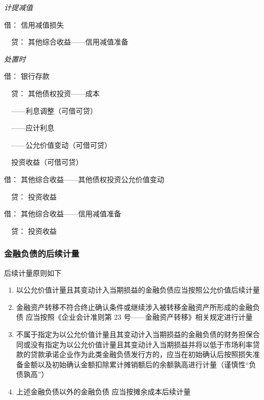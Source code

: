 \documentclass[UTF8,12pt]{ctexart}
\newenvironment{Dr}{\noindent 借：}{\par}
\newenvironment{Cr}{\noindent \ \ 贷：}{\par}
\numberwithin{equation}{section} %
\numberwithin{figure}{section}
\numberwithin{table}{section}
\begin{document}
	
	\textit{计提减值}
	
	\begin{Dr}
		信用减值损失
	\end{Dr}
	\begin{Cr}
		其他综合收益——信用减值准备
	\end{Cr}

	
	\textit{处置时}
	
	\begin{Dr}
		银行存款
	\end{Dr}
	\begin{Cr}
		其他债权投资——成本
		
		\ \ ——利息调整（可借可贷）
		
		\ \ ——应计利息
		
		\ \ ——公允价值变动（可借可贷） 
		
		\ \ 投资收益（可借可贷）
	\end{Cr}

	\begin{Dr}
		其他综合收益——其他债权投资公允价值变动
	\end{Dr}
	\begin{Cr}
		投资收益
	\end{Cr}
	
	\begin{Dr}
		其他综合收益——信用减值准备
	\end{Dr}
	\begin{Cr}
		投资收益
	\end{Cr}
	
	
	
	
	
	\subsubsection{金融负债的后续计量}
	后续计量原则如下
	\begin{enumerate}
		\item 以公允价值计量且其变动计入当期损益的金融负债应当按照公允价值后续计量
		
		\item 金融资产转移不符合终止确认条件或继续涉入被转移金融资产所形成的金融负债	应当按照《企业会计准则第 23 号——金融资产转移》相关规定进行计量
		
		\item 不属于指定为以公允价值计量且其变动计入当期损益的金融负债的财务担保合同或没有指定为以公允价值计量且其变动计入当期损益并将以低于市场利率贷款的贷款承诺企业作为此类金融负债发行方的，应当在初始确认后按照损失准备金额以及初始确认金额扣除累计摊销额后的余额孰高进行计量（谨慎性“负债孰高”）
		
		\item 上述金融负债以外的金融负债	应当按摊余成本后续计量
	\end{enumerate}
	
\end{document}
